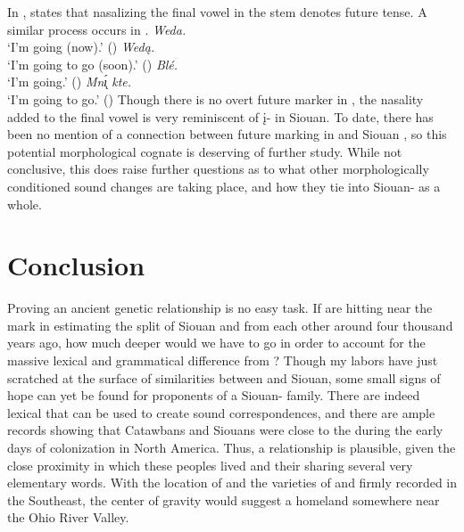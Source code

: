 \documentclass[output=paper]{LSP/langsci}
\begin{document}
In , \citet{Linn2000} states that nasalizing the final vowel in the stem denotes future tense. A similar process occurs in .
\ea
	\ea \textit{Weda.} \hfill {}\\
		`I'm going (now).' (\citealt[279]{Linn2000})
	\ex \textit{Wed\k{a}.} \hfill {}\\
		`I'm going to go (soon).' (\citealt[279]{Linn2000})
	\ex \textit{Bl\'e.} \hfill {}\\
		`I'm going.' (\citealt[75]{Ullrich2008})
	\ex \textit{Mn\k{\'\i} kte.} \hfill {}\\
		`I'm going to go.' (\citealt[75]{Ullrich2008})
	\z
\z
Though there is no overt future marker in , the nasality added to the final vowel is very reminiscent of \k{i}- in Siouan. To date, there has been no mention of a connection between future marking in  and Siouan , so this potential morphological cognate is deserving of further study. While not conclusive, this  does raise further questions as to what other morphologically conditioned sound changes are taking place, and how they tie into Siouan- as a whole.

\section{Conclusion}\label{sec:kasak:6}

Proving an ancient genetic relationship is no easy task. If \citet{ParksRankin2001} are hitting near the mark in estimating the split of Siouan and  from each other around four thousand years ago, how much deeper would we have to go in order to account for the massive lexical and grammatical difference from ? Though my labors have just scratched at the surface of similarities between  and Siouan, some small signs of hope can yet be found for proponents of a Siouan- family. There are indeed lexical  that can be used to create sound correspondences, and there are ample records showing that Catawbans and Siouans were close to the  during the early days of colonization in North America. Thus, a relationship is plausible, given the close proximity in which these peoples lived and their sharing several very elementary words. With the location of  and the varieties of  and  firmly recorded in the Southeast, the center of gravity would suggest a homeland somewhere near the Ohio River Valley.
\end{document}
